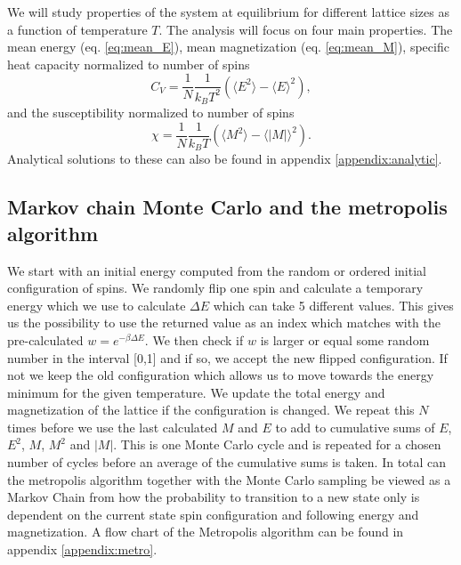\documentclass[english,notitlepage,reprint,nofootinbib]{revtex4-1}  %
\begin{document}
We will study properties of the system at equilibrium for different lattice sizes as a function of temperature $T$. The analysis will focus on four main properties. The mean energy (eq. \ref{eq:mean_E}), mean magnetization (eq. \ref{eq:mean_M}), specific heat capacity normalized to number of spins
\begin{equation}
    C_V = \frac{1}{N} \frac{1}{k_B T^2} \left( \langle E^2 \rangle - \langle E \rangle^2 \right),
\end{equation}
and the susceptibility normalized to number of spins
\begin{equation}
    \chi = \frac{1}{N} \frac{1}{k_B T} \left( \langle M^2 \rangle - \langle |M| \rangle^2 \right).
\end{equation}
Analytical solutions to these can also be found in appendix \ref{appendix:analytic}.


\subsection*{Markov chain Monte Carlo and the metropolis algorithm}
We start with an initial energy computed from the random or ordered initial configuration of spins. We randomly flip one spin and calculate a temporary energy which we use to calculate $\Delta E$ which can take 5 different values. This gives us the possibility to use the returned value as an index which matches with the pre-calculated $w= e^{-\beta \Delta E}$. We then check if $w$ is larger or equal some random number in the interval [0,1] and if so, we accept the new flipped configuration. If not we keep the old configuration which allows us to move towards the energy minimum for the given temperature. We update the total energy and magnetization of the lattice if the configuration is changed. We repeat this $N$ times before we use the last calculated $M$ and $E$ to add to cumulative sums of $E$, $E^2$, $M$, $M^2$ and $|M|$. This is one Monte Carlo cycle and is repeated for a chosen number of cycles before an average of the cumulative sums is taken. In total can the metropolis algorithm together with the Monte Carlo sampling be viewed as a Markov Chain from how the probability to transition to a new state only is dependent on the current state spin configuration and following energy and magnetization. A flow chart of the Metropolis algorithm can be found in appendix \ref{appendix:metro}.
\end{document}
